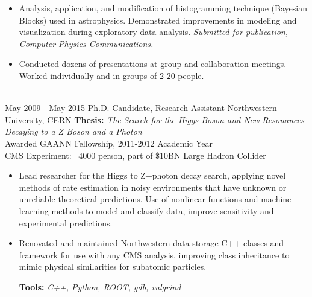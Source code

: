 \documentclass[letterpaper]{twentysecondcv} %
\begin{document}
\begin{twenty}
{\begin{itemize}
        \item Analysis, application, and modification of histogramming technique (Bayesian Blocks) used in astrophysics.  Demonstrated improvements in modeling and visualization during exploratory data analysis.  \textit{Submitted for publication, Computer Physics Communications.}
         \item Conducted dozens of presentations at group and collaboration meetings.  Worked individually and in groups of 2-20 people.
        \end{itemize}}
        \\
	\twentyitem
    	{May 2009 -}
		{May 2015}
        {Ph.D. Candidate, Research Assistant}
        {\href{https://www.physics.northwestern.edu/}{Northwestern University}, \href{https://home.cern/}{CERN}}
        {\textbf{Thesis:} \textit{The Search for the Higgs Boson and New Resonances Decaying to a Z Boson and a Photon}\\
        Awarded GAANN Fellowship, 2011-2012 Academic Year \\
        CMS Experiment: ~4000 person, part of \$10BN Large Hadron Collider}
        {
        {\begin{itemize}
         \vspace{-3mm}
        \item Lead researcher for the Higgs to Z+photon decay search, applying novel methods of rate estimation in noisy environments that have unknown or unreliable theoretical predictions. Use of nonlinear functions and machine learning methods to model and classify data, improve sensitivity and experimental predictions.
                
        \item Renovated and maintained Northwestern data storage C++ classes and framework for use with any CMS analysis, improving class inheritance to mimic physical similarities for subatomic particles.
		
		\textbf{Tools:} \textit{C++, Python, ROOT, gdb, valgrind}
    \end{itemize}}
        }

\end{twenty}

\vspace{-2mm}
\end{document}
